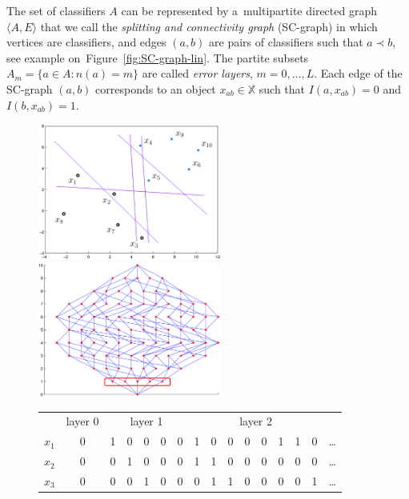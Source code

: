 \documentclass{article}
\def\XX{\mathbb{X}}
\def\XYtext(#1,#2)#3{\rlap{\kern#1\lower-#2\hbox{#3}}}
\renewcommand{\emph}[1]{\textit{#1}}
\begin{document}

The set of classifiers $A$ can be represented by
a~multipartite directed graph $\langle A, E \rangle$
that we call the \emph{splitting and connectivity graph} (SC-graph)
in which vertices are classifiers, and
edges $(a,b)$ are pairs of classifiers such that $a\prec b$,
see example on~Figure~\ref{fig:SC-graph-lin}.
The partite subsets $A_m = \{ a\in A\colon n(a)=m \}$
are called \emph{error layers}, $m=0,\ldots,L$.
Each edge of the SC-graph $(a,b)$ corresponds to an object $x_{ab}\in\XX$
such that $I(a,x_{ab})=0$ and $I(b,x_{ab})=1$.
\begin{figure}[t]
    \noindent\centering
    \includegraphics[width = 60mm]{SimpleSample1num.PNG.eps}
    \qquad
    \includegraphics[width = 60mm]{SimpleGraph1.PNG.eps}
    \XYtext(-65mm,43mm){\scriptsize{$m$}}%
    \\\medskip
    \scriptsize
    \begin{tabular}{c|c|ccccc|cccccccc|c}
        & {layer 0} &
        \multicolumn{5}{c|}{layer 1} &
        \multicolumn{8}{c|}{layer 2} \\
        $x_1$ & 0 & 1 & 0 & 0 & 0 & 0 & 1 & 0 & 0 & 0 & 0 & 1 & 1 & 0 & \ldots \\[-0.6ex]
        $x_2$ & 0 & 0 & 1 & 0 & 0 & 0 & 1 & 1 & 0 & 0 & 0 & 0 & 0 & 0 & \ldots \\[-0.6ex]
        $x_3$ & 0 & 0 & 0 & 1 & 0 & 0 & 0 & 1 & 1 & 0 & 0 & 0 & 0 & 1 & \ldots \\[-0.6ex]

\end{tabular}
\end{figure}
\end{document}
